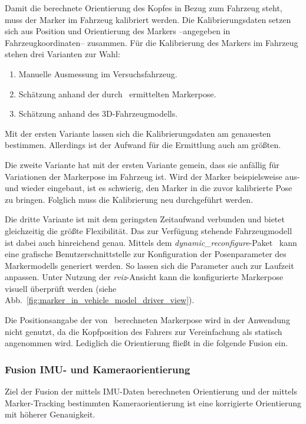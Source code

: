 Damit die berechnete Orientierung des Kopfes in Bezug zum Fahrzeug steht, muss der Marker im Fahrzeug kalibriert werden.
Die Kalibrierungsdaten setzen sich aus Position und Orientierung des Markers --angegeben in Fahrzeugkoordinaten-- zusammen.
Für die Kalibrierung des Markers im Fahrzeug stehen drei Varianten zur Wahl:
\begin{enumerate}
 \item Manuelle Ausmessung im Versuchsfahrzeug.
 \item Schätzung anhand der durch \alvar \ ermittelten Markerpose.
 \item Schätzung anhand des 3D-Fahrzeugmodells.
\end{enumerate}

Mit der ersten Variante lassen sich die Kalibrierungsdaten am genauesten bestimmen.
Allerdings ist der Aufwand für die Ermittlung auch am größten.

Die zweite Variante hat mit der ersten Variante gemein, dass sie anfällig für Variationen der Markerpose im Fahrzeug ist.
Wird der Marker beispielsweise aus- und wieder eingebaut, ist es schwierig, den Marker in die zuvor kalibrierte Pose zu bringen.
Folglich muss die Kalibrierung neu durchgeführt werden.

Die dritte Variante ist mit dem geringsten Zeitaufwand verbunden und bietet gleichzeitig die größte Flexibilität.
Das zur Verfügung stehende Fahrzeugmodell ist dabei auch hinreichend genau.
Mittels dem \emph{dynamic\_reconfigure}-Paket~\cite{ros_dynamic_reconfigure} kann eine grafische Benutzerschnittstelle zur Konfiguration der Posenparameter des Markermodells generiert werden.
So lassen sich die Parameter auch zur Laufzeit anpassen.
Unter Nutzung der \emph{rviz}-Ansicht kann die konfigurierte Markerpose visuell überprüft werden (siehe Abb.~\ref{fig:marker_in_vehicle_model_driver_view}).

Die Positionsangabe der von \alvar\ berechneten Markerpose wird in der Anwendung nicht genutzt, da die Kopfposition des Fahrers zur Vereinfachung als statisch angenommen wird.
Lediglich die Orientierung fließt in die folgende Fusion ein.

\subsubsection{Fusion IMU- und Kameraorientierung}
\label{headtracking_markerfusion_subsubsec}

Ziel der Fusion der mittels IMU-Daten berechneten Orientierung und der mittels Marker-Tracking bestimmten Kameraorientierung ist eine korrigierte Orientierung mit höherer Genauigkeit.

